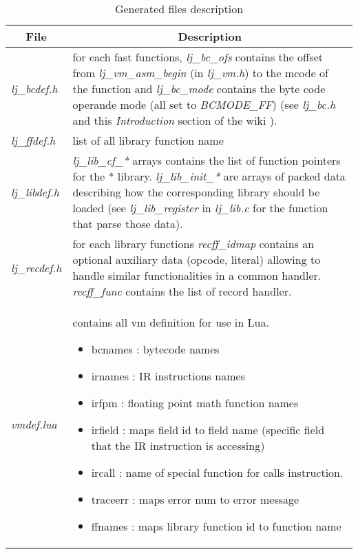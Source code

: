 \begin{table}[H]
\centering
\caption{Generated files description}
\label{tab:library-generated-files}
\begin{tabularx}{\textwidth}{|l|X|}
\hline
\multicolumn{1}{|c|}{File}          & \multicolumn{1}{c|}{Description}                      \\\hline
\emph{lj\_bcdef.h}                  &
  for each fast functions, \emph{lj\_bc\_ofs} contains the offset from
  \emph{lj\_vm\_asm\_begin} (in \emph{lj\_vm.h}) to the mcode of the function
  and \emph{lj\_bc\_mode} contains the byte code operande mode (all set to
  \emph{BCMODE\_FF}) (see \emph{lj\_bc.h} and this \emph{Introduction} section
  of the wiki \cite{luajit-bc}).                                                            \\\hline
\emph{lj\_ffdef.h}                  & list of all library function name                     \\\hline
\emph{lj\_libdef.h}                 &
  \emph{lj\_lib\_cf\_*} arrays contains the list of function pointers for the
  * library. \emph{lj\_lib\_init\_*} are arrays of packed data describing how
  the corresponding library should be loaded (see \emph{lj\_lib\_register} in
  \emph{lj\_lib.c} for the function that parse those data).                                 \\\hline
\emph{lj\_recdef.h}                 &
  for each library functions \emph{recff\_idmap} contains an optional auxiliary
  data (opcode, literal) allowing to handle similar functionalities in a
  common handler. \emph{recff\_func} contains the list of record handler.                   \\\hline
\emph{vmdef.lua}                    &
  contains all vm definition for use in Lua.
  \begin{itemize}
  \item bcnames  : bytecode names
  \item irnames  : IR instructions names
  \item irfpm    : floating point math function names
  \item irfield  : maps field id to field name (specific field that the IR instruction is accessing)
  \item ircall   : name of special function for calls instruction.
  \item traceerr : maps error num to error message
  \item ffnames  : maps library function id to function name
  \end{itemize}                                                                             \\\hline
\end{tabularx}
\end{table}


